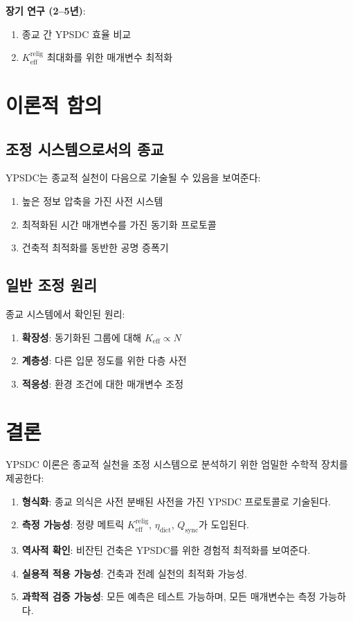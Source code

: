 \documentclass[12pt,a4paper]{article}
\begin{document}
	\textbf{장기 연구 (2–5년)}:
	\begin{enumerate}
		\item 종교 간 YPSDC 효율 비교
		\item $K_{\mathrm{eff}}^{\mathrm{relig}}$ 최대화를 위한 매개변수 최적화
	\end{enumerate}
	
	\section{이론적 함의}
	
	\subsection{조정 시스템으로서의 종교}
	
	YPSDC는 종교적 실천이 다음으로 기술될 수 있음을 보여준다:
	\begin{enumerate}
		\item 높은 정보 압축을 가진 사전 시스템
		\item 최적화된 시간 매개변수를 가진 동기화 프로토콜
		\item 건축적 최적화를 동반한 공명 증폭기
	\end{enumerate}
	
	\subsection{일반 조정 원리}
	
	종교 시스템에서 확인된 원리:
	\begin{enumerate}
		\item \textbf{확장성}: 동기화된 그룹에 대해 $K_{\mathrm{eff}} \propto N$
		\item \textbf{계층성}: 다른 입문 정도를 위한 다층 사전
		\item \textbf{적응성}: 환경 조건에 대한 매개변수 조정
	\end{enumerate}
	
	\section{결론}
	
	YPSDC 이론은 종교적 실천을 조정 시스템으로 분석하기 위한 엄밀한 수학적 장치를 제공한다:
	
	\begin{enumerate}
		\item \textbf{형식화}: 종교 의식은 사전 분배된 사전을 가진 YPSDC 프로토콜로 기술된다.
		\item \textbf{측정 가능성}: 정량 메트릭 $K_{\mathrm{eff}}^{\mathrm{relig}}$, $\eta_{\mathrm{dict}}$, $Q_{\mathrm{sync}}$가 도입된다.
		\item \textbf{역사적 확인}: 비잔틴 건축은 YPSDC를 위한 경험적 최적화를 보여준다.
		\item \textbf{실용적 적용 가능성}: 건축과 전례 실천의 최적화 가능성.
		\item \textbf{과학적 검증 가능성}: 모든 예측은 테스트 가능하며, 모든 매개변수는 측정 가능하다.
	\end{enumerate}
	
\end{document}
